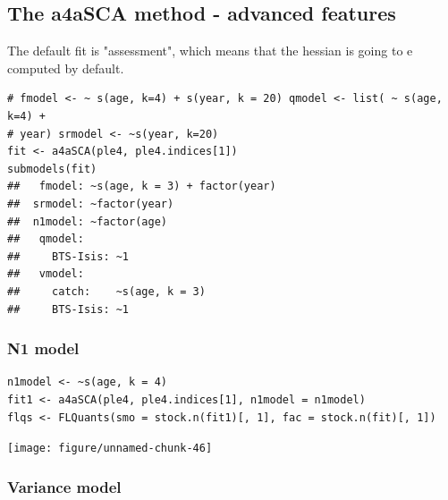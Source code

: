 \documentclass[a4paper,english,10pt]{article}\usepackage[]{graphicx}\usepackage[]{color}
\makeatletter
\newenvironment{kframe}{%
 \def\at@end@of@kframe{}%
 \ifinner\ifhmode%
  \def\at@end@of@kframe{\end{minipage}}%
  \begin{minipage}{\columnwidth}%
 \fi\fi%
 \def\FrameCommand##1{\hskip\@totalleftmargin \hskip-\fboxsep
 \colorbox{shadecolor}{##1}\hskip-\fboxsep
     \hskip-\linewidth \hskip-\@totalleftmargin \hskip\columnwidth}%
 \MakeFramed {\advance\hsize-\width
   \@totalleftmargin\z@ \linewidth\hsize
   \@setminipage}}%
 {\par\unskip\endMakeFramed%
 \at@end@of@kframe}
\newenvironment{knitrout}{}{} %
\makeatother
\begin{document}
\subsection{The a4aSCA method - advanced features}

The default fit is "assessment", which means that the hessian is going to e computed by default.

\begin{knitrout}
\color{fgcolor}\begin{kframe}
\begin{verbatim}
# fmodel <- ~ s(age, k=4) + s(year, k = 20) qmodel <- list( ~ s(age, k=4) +
# year) srmodel <- ~s(year, k=20)
fit <- a4aSCA(ple4, ple4.indices[1])
submodels(fit)
## 	 fmodel: ~s(age, k = 3) + factor(year)
## 	srmodel: ~factor(year)
## 	n1model: ~factor(age)
## 	 qmodel:
## 	   BTS-Isis: ~1
## 	 vmodel:
## 	   catch:    ~s(age, k = 3)
## 	   BTS-Isis: ~1
\end{verbatim}
\end{kframe}
\end{knitrout}


\subsubsection{N1 model}

\begin{knitrout}
\color{fgcolor}\begin{kframe}
\begin{verbatim}
n1model <- ~s(age, k = 4)
fit1 <- a4aSCA(ple4, ple4.indices[1], n1model = n1model)
flqs <- FLQuants(smo = stock.n(fit1)[, 1], fac = stock.n(fit)[, 1])
\end{verbatim}
\end{kframe}
\end{knitrout}


\begin{knitrout}
\color{fgcolor}

{\centering \texttt{[image: figure/unnamed-chunk-46]} 

}



\end{knitrout}


\subsubsection{Variance model}
\end{document}

